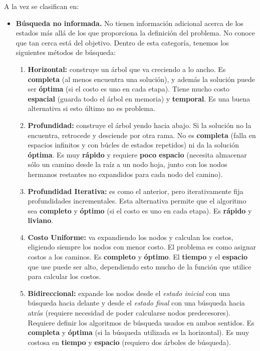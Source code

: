 \documentclass[10pt,a4paper]{article}
\begin{document}
A la vez se clasifican en:
\begin{itemize}
\item \textbf{Búsqueda no informada.} No tienen información adicional acerca de los estados más allá de los que proporciona la definición del problema. No conoce que tan cerca está del objetivo. Dentro de esta categoría, tenemos los siguientes métodos de búsqueda:
\begin{enumerate}
\item \textbf{Horizontal:} construye un árbol que va creciendo a lo ancho. Es \textbf{completa} (al menos encuentra una solución), y además la solución puede ser \textbf{óptima} (si el costo es uno en cada etapa). Tiene mucho costo \textbf{espacial} (guarda todo el árbol en memoria) y \textbf{temporal}. Es una buena alternativa si esto último no es problema.
\item \textbf{Profundidad:} construye el árbol yendo hacia abajo. Si la solución no la encuentra, retrocede y desciende por otra rama. No es \textbf{completa} (falla en espacios infinitos y con búcles de estados repetidos) ni da la solución \textbf{óptima}. Es muy \textbf{rápido} y requiere \textbf{poco espacio} (necesita almacenar sólo un camino desde la raíz a un nodo hoja, junto con los nodos hermanos restantes no expandidos para cada nodo del camino).
\item \textbf{Profundidad Iterativa:} es como el anterior, pero iterativamente fija profundidades incrementales. Esta alternativa permite que el algoritmo sea \textbf{completo} y \textbf{óptimo} (si el costo es uno en cada etapa). Es \textbf{rápido} y \textbf{liviano}.
\item \textbf{Costo Uniforme:} va expandiendo los nodos y calculan los costos, eligiendo siempre los nodos con menor costo. El problema es como asignar costos a los caminos. Es \textbf{completo} y \textbf{óptimo}. El \textbf{tiempo} y el \textbf{espacio} que use puede ser alto, dependiendo esto mucho de la función que utilice para calcular los costos.
\item \textbf{Bidireccional:} expande los nodos desde el \textit{estado inicial} con una búsqueda hacia delante y desde el \textit{estado final} con una búsqueda hacia atrás (requiere necesidad de poder calcularse nodos predecesores). Requiere definir los algoritmos de búsqueda usados en ambos sentidos. Es \textbf{completa} y \textbf{óptima} (si la búsqueda utilizada es la horizontal). Es muy costosa en \textbf{tiempo} y \textbf{espacio} (requiero dos árboles de búsqueda).
\end{enumerate}

\end{itemize}
\end{document}
